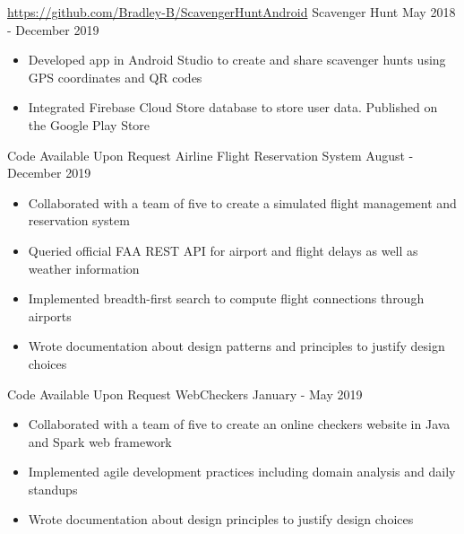 \documentclass{awesome-cv}
\begin{document}
		\begin{cventries}
			\cventry
				{\href{https://github.com/Bradley-B/ScavengerHuntAndroid}{https://github.com/Bradley-B/ScavengerHuntAndroid}}
				{Scavenger Hunt\small{\textnormal{\color{graytext}{, Personal Project}}}}
				{May 2018 - December 2019}
				{}
				{
					\vspace{-0.25cm}
					\begin{itemize}[nosep]
						\item Developed app in Android Studio to create and share scavenger hunts using GPS coordinates and QR codes 
						\item Integrated Firebase Cloud Store database to store user data. Published on the Google Play Store
					\end{itemize}
					\vspace{-0.5cm}
				}

			\cventry
				{Code Available Upon Request}
				{Airline Flight Reservation System\small{\textnormal{\color{graytext}{, Engineering of Software Subsystems}}}}
				{August - December 2019}
				{}
				{
					\vspace{-0.25cm}
					\begin{itemize}[nosep]
						\item Collaborated with a team of five to create a simulated flight management and reservation system
						\item Queried official FAA REST API for airport and flight delays as well as weather information
						\item Implemented breadth-first search to compute flight connections through airports
						\item Wrote documentation about design patterns and principles to justify design choices
					\end{itemize}
					\vspace{-0.5cm}
				}

			\cventry
				{Code Available Upon Request}
				{WebCheckers\small{\textnormal{\color{graytext}{, Introduction to Software Engineering}}}}
				{January - May 2019}
				{}
				{
					\vspace{-0.25cm}
					\begin{itemize}[nosep]
						\item Collaborated with a team of five to create an online checkers website in Java and Spark web framework
						\item Implemented agile development practices including domain analysis and daily standups
						\item Wrote documentation about design principles to justify design choices
					\end{itemize}
					\vspace{-0.5cm}
				}


\end{cventries}
\end{document}
